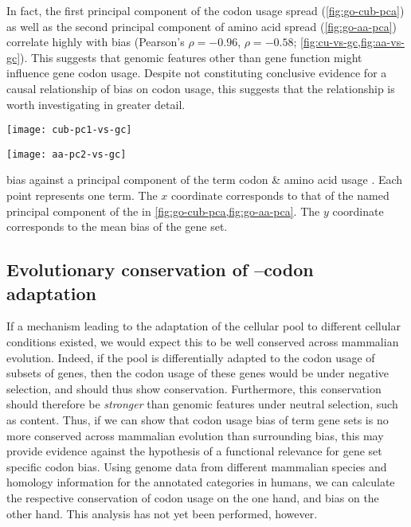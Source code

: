 In fact, the first principal component of the codon usage spread
(\cref{fig:go-cub-pca}) as well as the second principal component of amino acid
spread (\cref{fig:go-aa-pca}) correlate highly with \gc bias (Pearson’s \(\rho =
-0.96\), \(\rho = -0.58\); \cref{fig:cu-vs-gc,fig:aa-vs-gc}). This suggests that
genomic features other than gene function might influence gene codon usage.
Despite not constituting conclusive evidence for a causal relationship of \gc
bias on codon usage, this suggests that the relationship is worth investigating
in greater detail.

    {%
        \begin{minipage}{0.5\textwidth}
            \texttt{[image: cub-pc1-vs-gc]}%
        \end{minipage}%
        \begin{minipage}{0.5\textwidth}
            \texttt{[image: aa-pc2-vs-gc]}%
        \end{minipage}%
    }
    {\gc bias against a principal component of the \go term codon \& amino acid
    usage \pca.}
    {Each point represents one \go term. The \(x\) coordinate corresponds to
    that of the named principal component of the \pca in
    \cref{fig:go-cub-pca,fig:go-aa-pca}. The \(y\) coordinate corresponds to
    the mean \gc bias of the \go gene set.}

\subsection{Evolutionary conservation of --codon adaptation}

If a mechanism leading to the adaptation of the cellular \trna pool to different
cellular conditions existed, we would expect this to be well conserved across
mammalian evolution. Indeed, if the \trna pool is differentially adapted to the
codon usage of subsets of genes, then the codon usage of these genes would be
under negative selection, and should thus show conservation. Furthermore, this
conservation should therefore be \emph{stronger} than genomic features under
neutral selection, such as \gc content. Thus, if we can show that codon usage
bias of \go term gene sets is no more conserved across mammalian evolution than
surrounding \gc bias, this may provide evidence against the hypothesis of a
functional relevance for gene set specific codon bias. Using genome data from
different mammalian species and homology information for the annotated \go
categories in humans, we can calculate the respective conservation of codon
usage on the one hand, and \gc bias on the other hand. This analysis has not yet
been performed, however.
